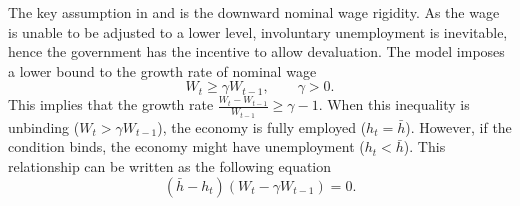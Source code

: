 The key assumption in \citet*{Schmitt-Uribe-16} and \citet*{Na-18} is the downward nominal wage rigidity.
As the wage is unable to be adjusted to a lower level, involuntary unemployment is inevitable, hence the government has the incentive to allow devaluation. The model imposes a lower bound to the growth rate of nominal wage
\begin{equation}
    W_t \ge \gamma W_{t-1}, \qquad \gamma > 0.
\end{equation}
This implies that the growth rate $\frac{W_{t} - W_{t-1}}{W_{t-1}} \ge \gamma - 1$. When this inequality is unbinding ($W_t > \gamma W_{t-1}$), the economy is fully employed ($h_t = \bar{h}$). However, if the condition binds, the economy might have unemployment ($h_t < \bar{h}$). This relationship can be written as the following equation
\begin{equation}
    \label{eq:wage-rigid}
    (\bar{h} - h_t)(W_t - \gamma W_{t-1}) = 0.
\end{equation}
